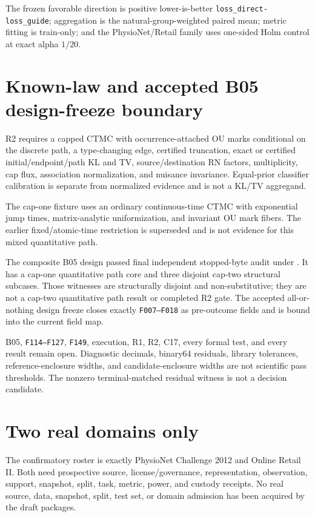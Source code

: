 \documentclass[11pt]{article}
\newcommand{\state}[1]{\texttt{#1}}
\begin{document}
The frozen favorable direction is positive lower-is-better
\texttt{loss\_direct-loss\_guide}; aggregation is the natural-group-weighted
paired mean; metric fitting is train-only; and the PhysioNet/Retail family uses
one-sided Holm control at exact alpha $1/20$.

\section{Known-law and accepted B05 design-freeze boundary}

R2 requires a capped CTMC with occurrence-attached OU marks conditional on the
discrete path, a type-changing edge, certified truncation, exact or certified
initial/endpoint/path KL and TV, source/destination RN factors, multiplicity,
cap flux, association normalization, and nuisance invariance. Equal-prior
classifier calibration is separate from normalized evidence and is not a
KL/TV aggregand.

The cap-one fixture uses an ordinary continuous-time CTMC with exponential
jump times, matrix-analytic uniformization, and invariant OU mark fibers. The
earlier fixed/atomic-time restriction is superseded and is not evidence for
this mixed quantitative path.

The composite B05 design passed final independent stopped-byte audit under
.
It has a cap-one quantitative path core and three disjoint cap-two structural
subcases. Those witnesses are structurally disjoint and non-substitutive; they
are not a cap-two quantitative path result or completed R2 gate. The accepted
all-or-nothing design freeze closes exactly \state{F007--F018} as pre-outcome
fields and is bound into the current field map.

B05, \state{F114--F127}, \state{F149}, execution, R1, R2, C17, every formal
test, and every result remain open. Diagnostic decimals, binary64 residuals,
library tolerances, reference-enclosure widths, and candidate-enclosure widths
are not scientific pass thresholds. The nonzero terminal-matched residual
witness is not a decision candidate.

\section{Two real domains only}

The confirmatory roster is exactly PhysioNet Challenge 2012 and Online Retail
II. Both need prospective source, license/governance, representation,
observation, support, snapshot, split, task, metric, power, and custody
receipts. No real source, data, snapshot, split, test set, or domain admission
has been acquired by the draft packages.
\end{document}
